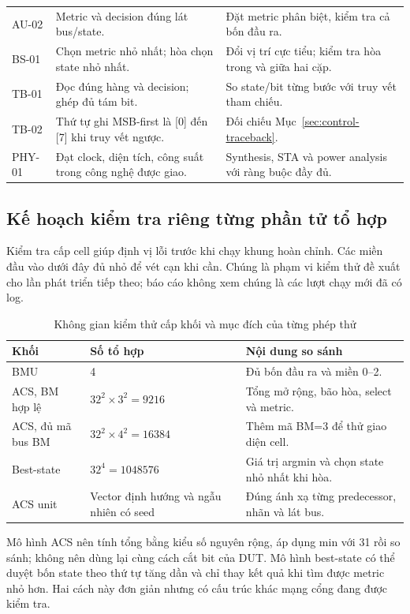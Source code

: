 \documentclass[12pt,a4paper]{article}
\renewcommand{\_}{\originalunderscore\allowbreak}
\begin{document}
\begin{longtable}{@{}P{1.7cm}P{7.4cm}P{5.9cm}@{}}
AU-02&Metric và decision đúng lát bus/state.&Đặt metric phân biệt, kiểm tra cả bốn đầu ra.\\
BS-01&Chọn metric nhỏ nhất; hòa chọn state nhỏ nhất.&Đổi vị trí cực tiểu; kiểm tra hòa trong và giữa hai cặp.\\
TB-01&Đọc đúng hàng và decision; ghép đủ tám bit.&So state/bit từng bước với truy vết tham chiếu.\\
TB-02&Thứ tự ghi MSB-first là [0] đến [7] khi truy vết ngược.&Đối chiếu Mục~\ref{sec:control-traceback}.\\
PHY-01&Đạt clock, diện tích, công suất trong công nghệ được giao.&Synthesis, STA và power analysis với ràng buộc đầy đủ.\\
\bottomrule\end{longtable}
\normalsize


\subsection{Kế hoạch kiểm tra riêng từng phần tử tổ hợp}
Kiểm tra cấp cell giúp định vị lỗi trước khi chạy khung hoàn chỉnh. Các miền đầu vào dưới đây đủ nhỏ để vét cạn khi cần. Chúng là phạm vi kiểm thử đề xuất cho lần phát triển tiếp theo; báo cáo không xem chúng là các lượt chạy mới đã có log.
\begin{table}[H]\centering\small
\begin{tabularx}{\textwidth}{@{}P{3.2cm}P{3.2cm}Y@{}}\toprule
\textbf{Khối}&\textbf{Số tổ hợp}&\textbf{Nội dung so sánh}\\\midrule
BMU&4&Đủ bốn đầu ra và miền 0--2.\\
ACS, BM hợp lệ&$32^2\times3^2=9216$&Tổng mở rộng, bão hòa, select và metric.\\
ACS, đủ mã bus BM&$32^2\times4^2=16384$&Thêm mã BM=3 để thử giao diện cell.\\
Best-state&$32^4=1048576$&Giá trị argmin và chọn state nhỏ nhất khi hòa.\\
ACS unit&Vector định hướng và ngẫu nhiên có seed&Đúng ánh xạ từng predecessor, nhãn và lát bus.\\\bottomrule
\end{tabularx}
\caption{Không gian kiểm thử cấp khối và mục đích của từng phép thử}
\end{table}
Mô hình ACS nên tính tổng bằng kiểu số nguyên rộng, áp dụng min với 31 rồi so sánh; không nên dùng lại cùng cách cắt bit của DUT. Mô hình best-state có thể duyệt bốn state theo thứ tự tăng dần và chỉ thay kết quả khi tìm được metric nhỏ hơn. Hai cách này đơn giản nhưng có cấu trúc khác mạng cổng đang được kiểm tra.
\end{document}
